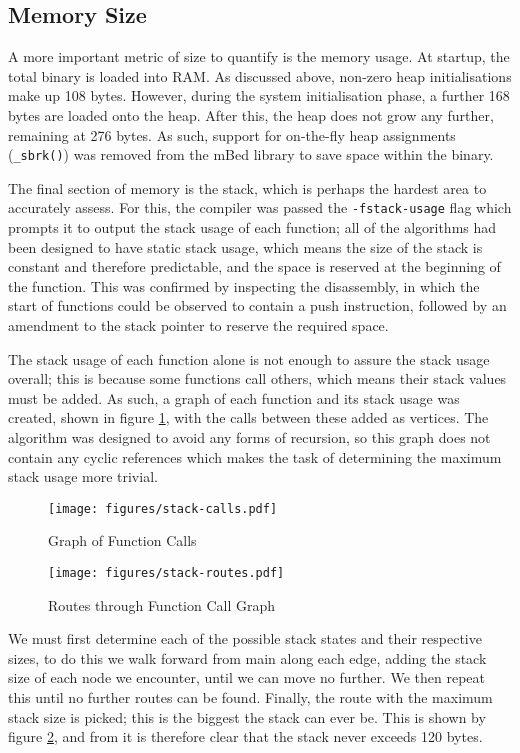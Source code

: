 \subsection{Memory Size}

A more important metric of size to quantify is the memory usage. At startup, the total binary is loaded into RAM. As discussed above, non-zero heap initialisations make up 108 bytes. However, during the system initialisation phase, a further 168 bytes are loaded onto the heap. After this, the heap does not grow any further, remaining at 276 bytes. As such, support for on-the-fly heap assignments (\verb|_sbrk()|) was removed from the mBed library to save space within the binary.

The final section of memory is the stack, which is perhaps the hardest area to accurately assess. For this, the compiler was passed the \verb|-fstack-usage| flag which prompts it to output the stack usage of each function; all of the algorithms had been designed to have static stack usage, which means the size of the stack is constant and therefore predictable, and the space is reserved at the beginning of the function. This was confirmed by inspecting the disassembly, in which the start of functions could be observed to contain a push instruction, followed by an amendment to the stack pointer to reserve the required space.

The stack usage of each function alone is not enough to assure the stack usage overall; this is because some functions call others, which means their stack values must be added. As such, a graph of each function and its stack usage was created, shown in figure \ref{fig:stack-calls}, with the calls between these added as vertices. The algorithm was designed to avoid any forms of recursion, so this graph does not contain any cyclic references which makes the task of determining the maximum stack usage more trivial.

\begin{figure}[!h]
    \centering
    \texttt{[image: figures/stack-calls.pdf]}
    \caption{Graph of Function Calls}
    \label{fig:stack-calls}
\end{figure}

\begin{figure}[!h]
    \centering
    \texttt{[image: figures/stack-routes.pdf]}
    \caption{Routes through Function Call Graph}
    \label{fig:stack-routes}
\end{figure}

We must first determine each of the possible stack states and their respective sizes, to do this we walk forward from main along each edge, adding the stack size of each node we encounter, until we can move no further. We then repeat this until no further routes can be found. Finally, the route with the maximum stack size is picked; this is the biggest the stack can ever be. This is shown by figure \ref{fig:stack-routes}, and from it is therefore clear that the stack never exceeds 120 bytes.

